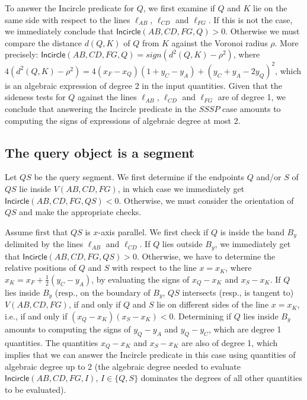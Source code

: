 \documentclass[letterpaper,11pt]{article}
\newcommand{\incircle}{\textsf{Incircle}\xspace}
\newcommand{\vor}{Voronoi\xspace}
\newcommand{\sssp}{$SSSP$\xspace}
\begin{document}
To answer the \incircle predicate for $Q$, we first examine if $Q$ and
$K$ lie on the same side with respect to the lines $\ell_{AB}$,
$\ell_{CD}$ and $\ell_{FG}$. If this is not the case, we immediately
conclude that $\incircle(AB,CD,FG,Q) >0$. Otherwise we must compare 
the distance $d(Q,K)$ of $Q$ from $K$ against the \vor radius
$\rho$. More precisely: $\incircle(AB,CD,FG,Q) = sign(d^2(Q,K)-\rho^2)$,
where $4(d^2(Q,K)-\rho^2)=4 (x_F-x_Q)(1+y_C-y_A)+(y_C+y_A-2y_Q)^2$,
which is an algebraic expression of degree 2 in the input
quantities. Given that the sideness tests for $Q$ against the lines
$\ell_{AB}$, $\ell_{CD}$ and $\ell_{FG}$ are of degree 1, we conclude
that answering the \incircle predicate in the \sssp case amounts to
computing the signs of expressions of algebraic degree at most 2.



\subsection{The query object is a segment}\label{sec:ssss}

Let $QS$ be the query segment. We first determine if the endpoints $Q$
and/or $S$ of $QS$ lie inside $V(AB,CD,FG)$, in which case we
immediately get $\incircle(AB,CD,FG,QS)<0$. Otherwise, we must
consider the orientation of $QS$ and make the appropriate checks.

Assume first that $QS$ is $x$-axis parallel. We first check if $Q$ is
inside the band $B_y$ delimited by the lines $\ell_{AB}$ and
$\ell_{CD}$. If $Q$ lies outside $B_y$, we immediately get that
$\incircle(AB,CD,FG,QS)>0$. Otherwise, we have to determine the
relative positions of $Q$ and $S$ with respect to the line $x=x_K$,
where $x_K=x_F+\frac{1}{2}(y_C-y_A)$, by evaluating the signs  
of $x_Q-x_K$ and $x_S-x_K$. If $Q$ lies inside $B_y$ (resp., on the
boundary  of $B_y$, $QS$ intersects (resp., is tangent to)
$V(AB,CD,FG)$, if and only if $Q$ and $S$ lie on different sides of
the line $x=x_K$, i.e., if and only if
$(x_Q-x_K)(x_S-x_K)<0$. Determining if $Q$ lies inside $B_y$ amounts
to computing the signs of $y_Q-y_A$ and $y_Q-y_C$, which are degree 1
quantities. The quantities $x_Q-x_K$ and $x_S-x_K$ are also of degree
1, which implies that we can answer the \incircle predicate in this
case using quantities of algebraic degree up to 2 (the algebraic
degree needed to evaluate $\incircle(AB,CD,FG,I)$, $I\in\{Q,S\}$
dominates the degrees of all other quantities to be evaluated).
\end{document}
